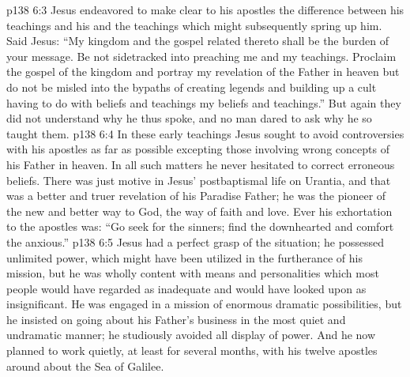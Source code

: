 \pc \vs p138 6:3 Jesus endeavored to make clear to his apostles the difference between his teachings and his  and the teachings which might subsequently spring up  him. Said Jesus: \textcolor{ubdarkred}{“My kingdom and the gospel related thereto shall be the burden of your message. Be not sidetracked into preaching  me and  my teachings. Proclaim the gospel of the kingdom and portray my revelation of the Father in heaven but do not be misled into the bypaths of creating legends and building up a cult having to do with beliefs and teachings  my beliefs and teachings.”} But again they did not understand why he thus spoke, and no man dared to ask why he so taught them.
\vs p138 6:4 In these early teachings Jesus sought to avoid controversies with his apostles as far as possible excepting those involving wrong concepts of his Father in heaven. In all such matters he never hesitated to correct erroneous beliefs. There was just  motive in Jesus’ postbaptismal life on Urantia, and that was a better and truer revelation of his Paradise Father; he was the pioneer of the new and better way to God, the way of faith and love. Ever his exhortation to the apostles was: \textcolor{ubdarkred}{“Go seek for the sinners; find the downhearted and comfort the anxious.”}
\vs p138 6:5 Jesus had a perfect grasp of the situation; he possessed unlimited power, which might have been utilized in the furtherance of his mission, but he was wholly content with means and personalities which most people would have regarded as inadequate and would have looked upon as insignificant. He was engaged in a mission of enormous dramatic possibilities, but he insisted on going about his Father’s business in the most quiet and undramatic manner; he studiously avoided all display of power. And he now planned to work quietly, at least for several months, with his twelve apostles around about the Sea of Galilee.

